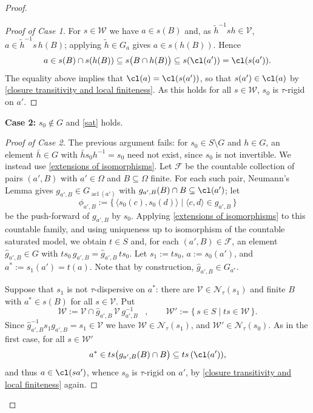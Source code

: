 \documentclass{article}
\theoremstyle{remark}
\theoremstyle{definition}
\DeclareMathOperator{\acl}{acl}
\newcommand{\V}[0]{\mathcal{V}}
\newcommand{\W}[0]{\mathcal{W}}
\newcommand*{\greysquare}{\textcolor{gray}{\blacksquare}}
\newenvironment{subproof}[1][\proofname]{%
\renewcommand{\qedsymbol}{$\greysquare$}%
\begin{proof}[#1]%
	}{%
\end{proof}%
}
\begin{document}
{{{{{\begin{proof}
\begin{subproof}[Proof of Case 1]
    For $s \in \W$ we have $a \in s(B)$ and, as $\tilde{h}^{-1} s h \in \V$,
  $a \in \tilde{h}^{-1} s\, h(B)$; applying $\tilde h \in G_a$ gives $a \in s(h(B))$. Hence
  \[
    a \in s(B) \cap s(h(B)) \subseteq s\bigl(B \cap h(B)\bigr) 
   \subseteq s(\cl(a')) = \cl(s(a')).
  \]
  	The equality above implies that $\cl(a)=\cl(s(a'))$, so that $s(a')\in\cl(a)$ by \cref{closure transitivity and local finiteness}. As this holds for all $s \in \W$,
  $s_0$ is $\tau$-rigid on $a'$.
  \end{subproof}
  
 	
 	  \textbf{Case 2:} $s_0 \notin G$ and \ref{sat} holds.
    \begin{subproof}[Proof of Case 2]
   The previous argument fails: for
  $s_0 \in S \setminus G$ and $h \in G$, an element $\bar{h} \in G$ with
  $\bar{h} s_0 h^{-1} = s_0$ need not exist, since $s_0$ is not invertible. We instead use
  \cref{extensions of isomorphisms}. Let $\mathcal{F}$ be the countable collection of pairs
  $(a', B)$ with $a' \in \Omega$ and $B \subseteq \Omega$ finite. For each such pair,
  Neumann's Lemma gives %
  {$g_{a',B} \in G_{\acl(a')}$}
  with $g_{a',B}(B) \cap B \subseteq \cl(a')$; let
  \[
    \phi_{a',B} := \{\, \langle s_0(c), s_0(d) \rangle \mid \langle c, d \rangle \in g_{a',B} \,\}
  \]
  be the push-forward of $g_{a',B}$ by $s_0$. Applying \cref{extensions of isomorphisms} to
  this countable family, and using uniqueness up to isomorphism of the countable saturated
  model, we obtain $t \in S$ and, for each $(a', B) \in \mathcal{F}$, an element
  $\hat{g}_{a',B} \in G$ with $t s_0\, g_{a',B} = \hat{g}_{a',B}\, t s_0$. {Let $s_1:=t s_0$, $a:=s_0(a')$, and $a^* := s_1(a') = t(a)$. Note that by construction, $\hat{g}_{a',B}\in G_{a^*}$.}

  {Suppose that $s_1$ is not $\tau$-dispersive on $a^*$:}
  there are $\V \in \mathcal{N}_\tau(s_1)$ and finite $B$ with $a^* \in s(B)$ for all
  $s \in \V$. Put
  \[
    \W := \V \cap \hat{g}_{a',B}\, \V\, g_{a',B}^{-1}\, \mbox{ } , \qquad
    \W' := \{\, s \in S \mid t s \in \W \,\}.
  \]
  Since $\hat{g}_{a',B}^{-1} s_1 g_{a',B} = s_1 \in \V$ we have $\W \in \mathcal{N}_\tau(s_1)$,
  and $\W' \in \mathcal{N}_\tau(s_0)$. As in the first case,  for all $s \in \W'$
  \[a^* \in ts\bigl(g_{a',B}(B) \cap B\bigr) \subseteq ts\,(\cl(a')),\] and thus $a\in \cl(sa')$, 
  whence $s_{0}$ is $\tau$-rigid on $a'$, by \cref{closure transitivity and local finiteness} again.
\end{subproof}\end{proof}
  
}}}}}
\end{document}
